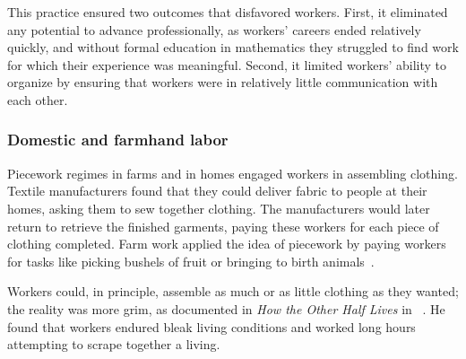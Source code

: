 \documentclass[trackingWork]{subfiles}
\begin{document}
This practice ensured two outcomes that disfavored workers.
First, it eliminated any potential to advance professionally, as
workers' careers ended relatively quickly,
and without formal education in mathematics they struggled to find work for which their experience was meaningful.
Second, it limited workers' ability to organize
by ensuring that workers were in relatively little communication with each other.



\subsubsection{Domestic and farmhand labor}

\begin{comment}
What did I pull from the threads that are related to domestic/farmwork?

- Graves: sparks of Scientific Management in Piecework, especially starting here
- 19th century: piecework was mostly cottage industry with untrained or informally trained workers
  (unlike industrial metal workers during WWII)
- Brown: Task variability matters
- Clark: pieceworkers work harder, more diligently, etc...
- Riis saw terrible conditions, documented and communicated it to the world

\citeauthor{clark1908cotton} observed textile mill pieceworkers and reported,
``When he works by the day the Italian operative wishes to leave before the whistle blows,
but if he works by the piece he will work as many hours as it is possible for him to stand''~\cite{clark1908cotton}.
\end{comment}

Piecework regimes in farms and in homes engaged workers in assembling clothing. %
Textile manufacturers found that they could deliver fabric to people at their homes, asking them to sew together clothing.
The manufacturers would later return to retrieve the finished garments,
paying these workers for each piece of clothing completed. 
Farm work applied the idea of piecework by
paying workers for tasks like picking bushels of fruit or bringing to birth animals~\cite{10.2307/2338394}.

Workers could, in principle, assemble as much or as little clothing as they wanted;
the reality was more grim, as
\citeauthor{riisOtherSideLives} documented in \textit{How the Other Half Lives} in \citeyear{riisOtherSideLives}~\cite{riisOtherSideLives}.
He found that
workers endured bleak living conditions and
worked long hours attempting to scrape together a living.
\end{document}
